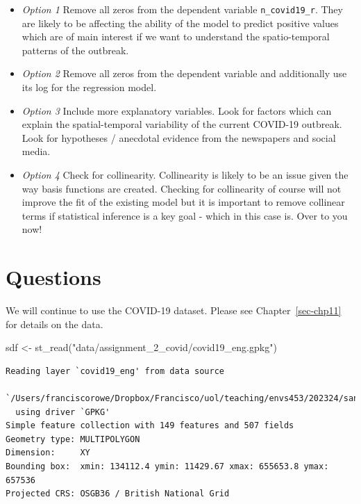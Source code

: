 \documentclass[
  letterpaper,
  DIV=11,
  numbers=noendperiod,
  oneside]{scrreprt}
\newenvironment{Shaded}{\begin{snugshade}}{\end{snugshade}}
\newcommand{\FunctionTok}[1]{\textcolor[rgb]{0.28,0.35,0.67}{#1}}
\newcommand{\NormalTok}[1]{\textcolor[rgb]{0.00,0.23,0.31}{#1}}
\newcommand{\OtherTok}[1]{\textcolor[rgb]{0.00,0.23,0.31}{#1}}
\newcommand{\StringTok}[1]{\textcolor[rgb]{0.13,0.47,0.30}{#1}}
\providecommand{\tightlist}{%
  \setlength{\itemsep}{0pt}\setlength{\parskip}{0pt}}\usepackage{longtable,booktabs,array}
\begin{document}
\begin{itemize}
\tightlist
\item
  \emph{Option 1} Remove all zeros from the dependent variable
  \texttt{n\_covid19\_r}. They are likely to be affecting the ability of
  the model to predict positive values which are of main interest if we
  want to understand the spatio-temporal patterns of the outbreak.
\item
  \emph{Option 2} Remove all zeros from the dependent variable and
  additionally use its log for the regression model.
\item
  \emph{Option 3} Include more explanatory variables. Look for factors
  which can explain the spatial-temporal variability of the current
  COVID-19 outbreak. Look for hypotheses / anecdotal evidence from the
  newspapers and social media.
\item
  \emph{Option 4} Check for collinearity. Collinearity is likely to be
  an issue given the way basis functions are created. Checking for
  collinearity of course will not improve the fit of the existing model
  but it is important to remove collinear terms if statistical inference
  is a key goal - which in this case is. Over to you now!
\end{itemize}

\section{Questions}\label{questions-6}

We will continue to use the COVID-19 dataset. Please see
Chapter~\ref{sec-chp11} for details on the data.

\begin{Shaded}
\begin{Highlighting}[]
\NormalTok{sdf }\OtherTok{\textless{}{-}} \FunctionTok{st\_read}\NormalTok{(}\StringTok{"data/assignment\_2\_covid/covid19\_eng.gpkg"}\NormalTok{)}
\end{Highlighting}
\end{Shaded}

\begin{verbatim}
Reading layer `covid19_eng' from data source 
  `/Users/franciscorowe/Dropbox/Francisco/uol/teaching/envs453/202324/san/data/assignment_2_covid/covid19_eng.gpkg' 
  using driver `GPKG'
Simple feature collection with 149 features and 507 fields
Geometry type: MULTIPOLYGON
Dimension:     XY
Bounding box:  xmin: 134112.4 ymin: 11429.67 xmax: 655653.8 ymax: 657536
Projected CRS: OSGB36 / British National Grid
\end{verbatim}
\end{document}
